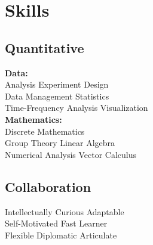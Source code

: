 \documentclass[letterpaper]{deedy-resume} %
\begin{document}
\vspace{0pt}
\begin{minipage}[t]{0.32\textwidth} %
\section{Skills}
\sectionspace

\subsection{Quantitative}
\sectionspace
\textbf{Data:}\\
Analysis \textbullet{} Experiment Design\\
Data Management \textbullet{} Statistics\\
Time-Frequency Analysis \textbullet{} Visualization\\

\textbf{Mathematics:}\\
Discrete Mathematics\\
Group Theory \textbullet{} Linear Algebra\\
Numerical Analysis \textbullet{} Vector Calculus

\sectionspace\sectionspace

\subsection{Collaboration}
\sectionspace
Intellectually Curious \textbullet{} Adaptable\\
Self-Motivated \textbullet{} Fast Learner\\
Flexible \textbullet{} Diplomatic \textbullet{} Articulate


\end{minipage}
\end{document}
